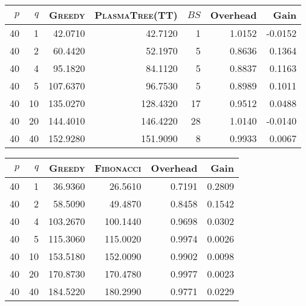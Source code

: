 \documentclass[a4paper,twopages]{article}
\newcommand{\BS}{\ensuremath{\mathit{BS}}\xspace}
\newcommand{\MC}{\textsc{Fibonacci}\xspace}
\newcommand{\Greedy}{\textsc{Greedy}\xspace}
\newcommand{\PT}{\textsc{PlasmaTree}\xspace}
\begin{document}
\begin{table*}
    \centering
    \begin{tabular}{|r|r|r||r|r|r|r|}
       \hline
         $p$ &  $q$ & \Greedy & \PT (TT) & \BS & Overhead &   Gain\\
         \hline
        40 &  1 &   42.0710 &   42.7120 &  1 &   1.0152 &-0.0152\\
        40 &  2 &   60.4420 &   52.1970 &  5 &   0.8636 & 0.1364\\
        40 &  4 &   95.1820 &   84.1120 &  5 &   0.8837 & 0.1163\\
        40 &  5 &  107.6370 &   96.7530 &  5 &   0.8989 & 0.1011\\
        40 & 10 &  135.0270 &  128.4320 & 17 &   0.9512 & 0.0488\\
        40 & 20 &  144.4010 &  146.4220 & 28 &   1.0140 &-0.0140\\
        40 & 40 &  152.9280 &  151.9090 &  8 &   0.9933 & 0.0067\\
       \hline
    \end{tabular}
    \caption{\Greedy versus \PT (TT) (Experimental Double Complex)}
\end{table*}
\begin{table*}
    \centering
    \begin{tabular}{|r|r|r||r|r|r|}
         \hline
         $p$ &  $q$ & \Greedy &    \MC & Overhead &   Gain\\
         \hline
        40 &  1 &   36.9360 &  26.5610  &   0.7191 & 0.2809\\
        40 &  2 &   58.5090 &  49.4870  &   0.8458 & 0.1542\\
        40 &  4 &  103.2670 & 100.1440  &   0.9698 & 0.0302\\
        40 &  5 &  115.3060 & 115.0020  &   0.9974 & 0.0026\\
        40 & 10 &  153.5180 & 152.0090  &   0.9902 & 0.0098\\
        40 & 20 &  170.8730 & 170.4780  &   0.9977 & 0.0023\\
        40 & 40 &  184.5220 & 180.2990  &   0.9771 & 0.0229\\
         \hline
    \end{tabular}
    \caption{Greedy versus \MC (Experimental Double)}
\end{table*}
\end{document}
